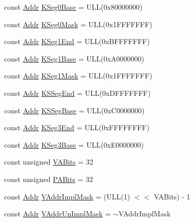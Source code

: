 \begin{DoxyCompactItemize}
const \hyperlink{base_2types_8hh_af1bb03d6a4ee096394a6749f0a169232}{Addr} \hyperlink{namespaceMipsISA_a5c564cd116eed9a5e53455bb05c172dd}{KSeg0Base} = ULL(0x80000000)
\item 
const \hyperlink{base_2types_8hh_af1bb03d6a4ee096394a6749f0a169232}{Addr} \hyperlink{namespaceMipsISA_a600dd0a3afcfca38ac64b6e81fe2dec9}{KSeg0Mask} = ULL(0x1FFFFFFF)
\item 
const \hyperlink{base_2types_8hh_af1bb03d6a4ee096394a6749f0a169232}{Addr} \hyperlink{namespaceMipsISA_a8dea782f9c049005da962641bed6fabe}{KSeg1End} = ULL(0xBFFFFFFF)
\item 
const \hyperlink{base_2types_8hh_af1bb03d6a4ee096394a6749f0a169232}{Addr} \hyperlink{namespaceMipsISA_a03b2e8fb6bf515015926b3c4251b9c0f}{KSeg1Base} = ULL(0xA0000000)
\item 
const \hyperlink{base_2types_8hh_af1bb03d6a4ee096394a6749f0a169232}{Addr} \hyperlink{namespaceMipsISA_ad90b05c1f6375f46c143d07924601551}{KSeg1Mask} = ULL(0x1FFFFFFF)
\item 
const \hyperlink{base_2types_8hh_af1bb03d6a4ee096394a6749f0a169232}{Addr} \hyperlink{namespaceMipsISA_a403fce24705117c576c91259ed1fe53e}{KSSegEnd} = ULL(0xDFFFFFFF)
\item 
const \hyperlink{base_2types_8hh_af1bb03d6a4ee096394a6749f0a169232}{Addr} \hyperlink{namespaceMipsISA_aa0fc64a650db916ba182c49770748467}{KSSegBase} = ULL(0xC0000000)
\item 
const \hyperlink{base_2types_8hh_af1bb03d6a4ee096394a6749f0a169232}{Addr} \hyperlink{namespaceMipsISA_a1d52f1ba85447a440e326de0bda5f360}{KSeg3End} = ULL(0xFFFFFFFF)
\item 
const \hyperlink{base_2types_8hh_af1bb03d6a4ee096394a6749f0a169232}{Addr} \hyperlink{namespaceMipsISA_a53c72053cff8d2410c867bd04c7e8838}{KSeg3Base} = ULL(0xE0000000)
\item 
const unsigned \hyperlink{namespaceMipsISA_a10ace529e46442ee4127c149da6513af}{VABits} = 32
\item 
const unsigned \hyperlink{namespaceMipsISA_a61386a9be90bc58024550fdbeb6ebaee}{PABits} = 32
\item 
const \hyperlink{base_2types_8hh_af1bb03d6a4ee096394a6749f0a169232}{Addr} \hyperlink{namespaceMipsISA_a3d31b41fa4d20dbbd91b61d7df201ac9}{VAddrImplMask} = (ULL(1) $<$$<$ VABits) -\/ 1
\item 
const \hyperlink{base_2types_8hh_af1bb03d6a4ee096394a6749f0a169232}{Addr} \hyperlink{namespaceMipsISA_abf1ec857b893186376e563b0da26ec1b}{VAddrUnImplMask} = $\sim$VAddrImplMask
\item 
$$
\end{DoxyCompactItemize}
